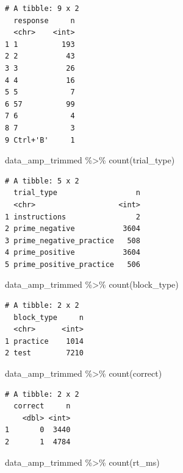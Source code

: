 \documentclass[
  letterpaper,
  DIV=11,
  numbers=noendperiod]{scrreprt}
\newenvironment{Shaded}{\begin{snugshade}}{\end{snugshade}}
\newcommand{\FunctionTok}[1]{\textcolor[rgb]{0.28,0.35,0.67}{#1}}
\newcommand{\NormalTok}[1]{\textcolor[rgb]{0.00,0.23,0.31}{#1}}
\newcommand{\SpecialCharTok}[1]{\textcolor[rgb]{0.37,0.37,0.37}{#1}}
\begin{document}
\begin{verbatim}
# A tibble: 9 x 2
  response     n
  <chr>    <int>
1 1          193
2 2           43
3 3           26
4 4           16
5 5            7
6 57          99
7 6            4
8 7            3
9 Ctrl+'B'     1
\end{verbatim}

\begin{Shaded}
\begin{Highlighting}[]
\NormalTok{data\_amp\_trimmed }\SpecialCharTok{\%\textgreater{}\%}
  \FunctionTok{count}\NormalTok{(trial\_type)}
\end{Highlighting}
\end{Shaded}

\begin{verbatim}
# A tibble: 5 x 2
  trial_type                  n
  <chr>                   <int>
1 instructions                2
2 prime_negative           3604
3 prime_negative_practice   508
4 prime_positive           3604
5 prime_positive_practice   506
\end{verbatim}

\begin{Shaded}
\begin{Highlighting}[]
\NormalTok{data\_amp\_trimmed }\SpecialCharTok{\%\textgreater{}\%}
  \FunctionTok{count}\NormalTok{(block\_type)}
\end{Highlighting}
\end{Shaded}

\begin{verbatim}
# A tibble: 2 x 2
  block_type     n
  <chr>      <int>
1 practice    1014
2 test        7210
\end{verbatim}

\begin{Shaded}
\begin{Highlighting}[]
\NormalTok{data\_amp\_trimmed }\SpecialCharTok{\%\textgreater{}\%}
  \FunctionTok{count}\NormalTok{(correct)}
\end{Highlighting}
\end{Shaded}

\begin{verbatim}
# A tibble: 2 x 2
  correct     n
    <dbl> <int>
1       0  3440
2       1  4784
\end{verbatim}

\begin{Shaded}
\begin{Highlighting}[]
\NormalTok{data\_amp\_trimmed }\SpecialCharTok{\%\textgreater{}\%}
  \FunctionTok{count}\NormalTok{(rt\_ms)}
\end{Highlighting}
\end{Shaded}
\end{document}
